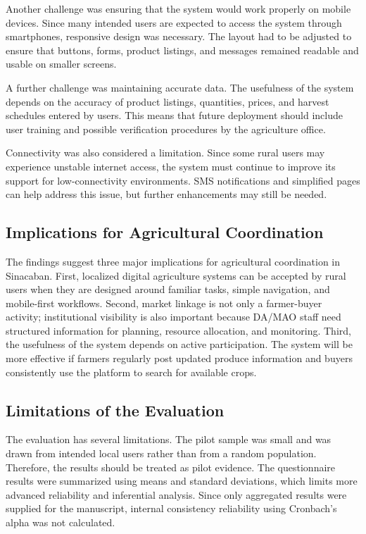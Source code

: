 Another challenge was ensuring that the system would work properly on mobile devices. Since many intended users are expected to access the system through smartphones, responsive design was necessary. The layout had to be adjusted to ensure that buttons, forms, product listings, and messages remained readable and usable on smaller screens.

A further challenge was maintaining accurate data. The usefulness of the system depends on the accuracy of product listings, quantities, prices, and harvest schedules entered by users. This means that future deployment should include user training and possible verification procedures by the agriculture office.

Connectivity was also considered a limitation. Since some rural users may experience unstable internet access, the system must continue to improve its support for low-connectivity environments. SMS notifications and simplified pages can help address this issue, but further enhancements may still be needed.

\subsection{Implications for Agricultural Coordination}

The findings suggest three major implications for agricultural coordination in Sinacaban. First, localized digital agriculture systems can be accepted by rural users when they are designed around familiar tasks, simple navigation, and mobile-first workflows. Second, market linkage is not only a farmer-buyer activity; institutional visibility is also important because DA/MAO staff need structured information for planning, resource allocation, and monitoring. Third, the usefulness of the system depends on active participation. The system will be more effective if farmers regularly post updated produce information and buyers consistently use the platform to search for available crops.

\subsection{Limitations of the Evaluation}

The evaluation has several limitations. The pilot sample was small and was drawn from intended local users rather than from a random population. Therefore, the results should be treated as pilot evidence. The questionnaire results were summarized using means and standard deviations, which limits more advanced reliability and inferential analysis. Since only aggregated results were supplied for the manuscript, internal consistency reliability using Cronbach's alpha was not calculated.

